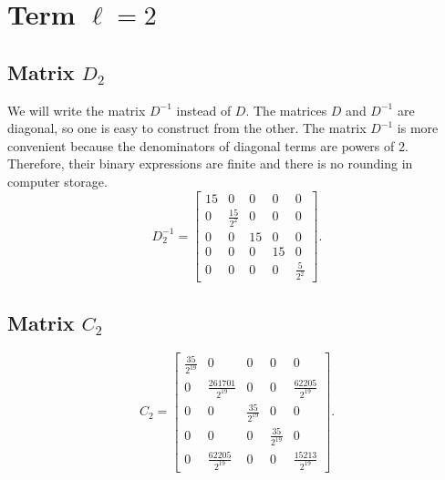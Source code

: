 \section{Term $\ell=2$}
\subsection{Matrix $D_2$}
We will write the matrix $D^{-1}$ instead of $D$. The matrices $D$ and $D^{-1}$ are diagonal, so one is easy to construct from the other. The matrix $D^{-1}$ is more convenient because the denominators of diagonal terms are powers of $2$. Therefore, their binary expressions are finite and there is no rounding in computer storage.\[D_2^{-1}=\left[\begin{array}{ccccc}
15 & 0 & 0 & 0 & 0\\
0 & \frac{15}{2^{2}} & 0 & 0 & 0\\
0 & 0 & 15 & 0 & 0\\
0 & 0 & 0 & 15 & 0\\
0 & 0 & 0 & 0 & \frac{5}{2^{2}}
\end{array}\right].\]
\subsection{Matrix $C_2$}
\[C_2=\left[\begin{array}{ccccc}
\frac{35}{2^{19}} & 0 & 0 & 0 & 0\\
0 & \frac{261701}{2^{19}} & 0 & 0 & \frac{62205}{2^{19}}\\
0 & 0 & \frac{35}{2^{19}} & 0 & 0\\
0 & 0 & 0 & \frac{35}{2^{19}} & 0\\
0 & \frac{62205}{2^{19}} & 0 & 0 & \frac{15213}{2^{19}}
\end{array}\right].\]

